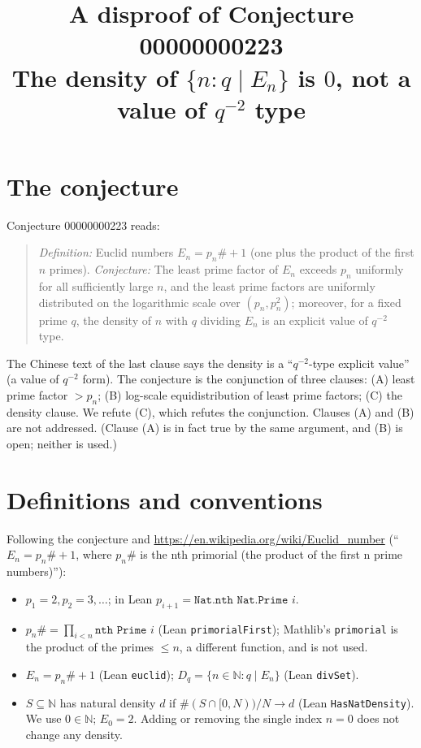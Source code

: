 \documentclass[11pt]{article}
\title{A disproof of Conjecture 00000000223\\[2pt]
\large The density of $\{n : q \mid E_n\}$ is $0$, not a value of $q^{-2}$ type}
\date{}
\renewcommand{\_}{\oldus\allowbreak}
\theoremstyle{definition}
\theoremstyle{remark}
\begin{document}
\sloppy
\maketitle

\section{The conjecture}

Conjecture 00000000223 reads:
\begin{quote}
\emph{Definition:} Euclid numbers $E_n = p_n\# + 1$ (one plus the product of the first $n$ primes).
\emph{Conjecture:} The least prime factor of $E_n$ exceeds $p_n$ uniformly for all sufficiently large $n$, and
the least prime factors are uniformly distributed on the logarithmic scale over $(p_n, p_n^2)$; moreover, for a
fixed prime $q$, the density of $n$ with $q$ dividing $E_n$ is an explicit value of $q^{-2}$ type.
\end{quote}
The Chinese text of the last clause says the density is a ``$q^{-2}$-type explicit value'' (a value of
$q^{-2}$ form). The conjecture is the conjunction of three clauses: (A) least prime factor $> p_n$; (B)
log-scale equidistribution of least prime factors; (C) the density clause. We refute (C), which refutes the
conjunction. Clauses (A) and (B) are not addressed. (Clause (A) is in fact true by the same argument, and (B)
is open; neither is used.)

\section{Definitions and conventions}

Following the conjecture and \url{https://en.wikipedia.org/wiki/Euclid_number} (``$E_n = p_n\# + 1$, where
$p_n\#$ is the nth primorial (the product of the first n prime numbers)''):
\begin{itemize}[nosep]
\item $p_1 = 2, p_2 = 3, \dots$; in Lean $p_{i+1} = \texttt{Nat.nth Nat.Prime } i$.
\item $p_n\# = \prod_{i<n} \texttt{nth Prime } i$ (Lean \texttt{primorialFirst}); Mathlib's \texttt{primorial}
  is the product of the primes $\le n$, a different function, and is not used.
\item $E_n = p_n\# + 1$ (Lean \texttt{euclid}); $D_q = \{n \in \mathbb{N} : q \mid E_n\}$ (Lean \texttt{divSet}).
\item $S \subseteq \mathbb{N}$ has natural density $d$ if $\#(S \cap [0,N))/N \to d$ (Lean
  \texttt{HasNatDensity}). We use $0 \in \mathbb{N}$; $E_0 = 2$. Adding or removing the single index $n=0$
  does not change any density.
\end{itemize}
\end{document}
